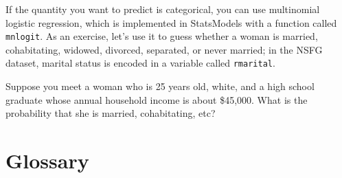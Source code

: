 \begin{exercise}
If the quantity you want to predict is categorical, you can use
multinomial logistic regression, which is implemented in StatsModels
with a function called {\tt mnlogit}.  As an exercise, let's use it to
guess whether a woman is married, cohabitating, widowed, divorced,
separated, or never married; in the NSFG dataset, marital status is
encoded in a variable called {\tt rmarital}.

Suppose you meet a woman who is 25 years old, white, and a high
school graduate whose annual household income is about \$45,000.
What is the probability that she is married, cohabitating, etc?
\end{exercise}




\section{Glossary}

